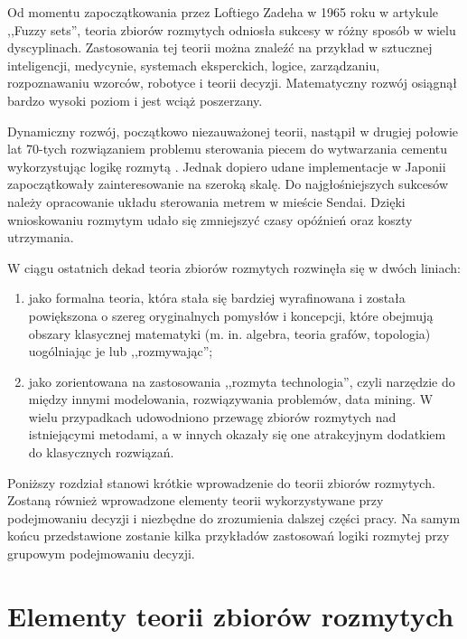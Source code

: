 Od momentu zapoczątkowania przez Loftiego Zadeha w 1965 roku w artykule ,,Fuzzy
sets'', teoria zbiorów rozmytych odniosła sukcesy w różny sposób w wielu
dyscyplinach. Zastosowania tej teorii można znaleźć na przykład w sztucznej 
inteligencji, medycynie, systemach eksperckich, logice, zarządzaniu, 
rozpoznawaniu wzorców, robotyce i teorii decyzji. Matematyczny rozwój osiągnął 
bardzo wysoki poziom i jest wciąż poszerzany.

Dynamiczny rozwój, początkowo niezauważonej teorii, nastąpił w drugiej połowie 
lat 70-tych rozwiązaniem problemu sterowania piecem do wytwarzania cementu 
wykorzystując logikę rozmytą \cite{Mamdani1974}. Jednak dopiero udane
implementacje w Japonii zapoczątkowały zainteresowanie na szeroką skalę. Do
najgłośniejszych sukcesów należy opracowanie układu sterowania metrem w mieście
Sendai. Dzięki wnioskowaniu rozmytym udało się zmniejszyć czasy opóźnień oraz
koszty utrzymania.

W ciągu ostatnich dekad teoria zbiorów rozmytych rozwinęła się w dwóch liniach:
\begin{enumerate}[1)]
  
  \item jako formalna teoria, która stała się bardziej wyrafinowana i została 
  powiększona o szereg oryginalnych pomysłów i koncepcji, które obejmują obszary 
  klasycznej matematyki (m. in. algebra, teoria grafów, topologia) uogólniając
  je lub ,,rozmywając'';
  
  \item jako zorientowana na zastosowania ,,rozmyta technologia'', czyli
  narzędzie do między innymi modelowania, rozwiązywania problemów, data mining. 
  W wielu przypadkach udowodniono przewagę zbiorów rozmytych nad istniejącymi 
  metodami, a w innych okazały się one atrakcyjnym dodatkiem do klasycznych 
  rozwiązań.

\end{enumerate}

Poniższy rozdział stanowi krótkie wprowadzenie do teorii zbiorów rozmytych. 
Zostaną również wprowadzone elementy teorii wykorzystywane przy podejmowaniu 
decyzji i niezbędne do zrozumienia dalszej części pracy. Na samym końcu 
przedstawione zostanie kilka przykładów zastosowań logiki rozmytej przy 
grupowym podejmowaniu decyzji.

\section{Elementy teorii zbiorów rozmytych}

